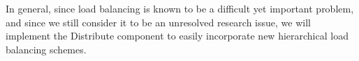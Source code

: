 \documentclass[11pt,letterpaper]{article}
\newcommand{\code}[1]{\textsf{#1}}
\begin{document}
In general, since load balancing is known to be a difficult yet
important problem, and since we still consider it to be an unresolved
research issue, we will implement the \code{Distribute} component to
easily incorporate new hierarchical load balancing schemes.



%      
% 
% 
\end{document}
